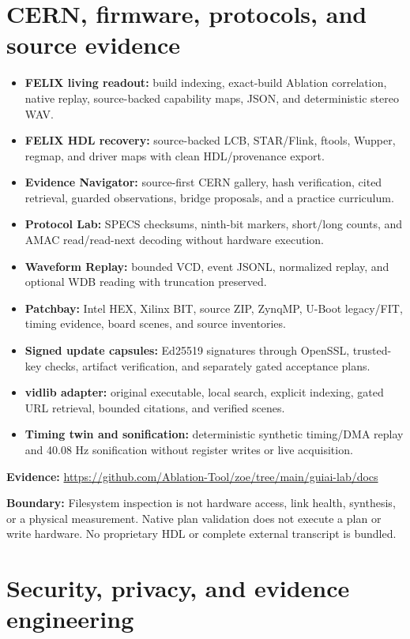 \documentclass[11pt]{article}
\newcommand{\boundary}[1]{\par\smallskip\small\color{ZoeGray}\textbf{Boundary:} #1\normalsize\par\smallskip}
\newcommand{\evidence}[1]{\par\smallskip\small\color{ZoeGray}\textbf{Evidence:} #1\normalsize\par\smallskip}
\begin{document}
\clearpage
\section{CERN, firmware, protocols, and source evidence}

\begin{itemize}
  \item \textbf{FELIX living readout:} build indexing, exact-build Ablation correlation, native replay, source-backed capability maps, JSON, and deterministic stereo WAV.
  \item \textbf{FELIX HDL recovery:} source-backed LCB, STAR/Flink, ftools, Wupper, regmap, and driver maps with clean HDL/provenance export.
  \item \textbf{Evidence Navigator:} source-first CERN gallery, hash verification, cited retrieval, guarded observations, bridge proposals, and a practice curriculum.
  \item \textbf{Protocol Lab:} SPECS checksums, ninth-bit markers, short/long counts, and AMAC read/read-next decoding without hardware execution.
  \item \textbf{Waveform Replay:} bounded VCD, event JSONL, normalized replay, and optional WDB reading with truncation preserved.
  \item \textbf{Patchbay:} Intel HEX, Xilinx BIT, source ZIP, ZynqMP, U-Boot legacy/FIT, timing evidence, board scenes, and source inventories.
  \item \textbf{Signed update capsules:} Ed25519 signatures through OpenSSL, trusted-key checks, artifact verification, and separately gated acceptance plans.
  \item \textbf{vidlib adapter:} original executable, local search, explicit indexing, gated URL retrieval, bounded citations, and verified scenes.
  \item \textbf{Timing twin and sonification:} deterministic synthetic timing/DMA replay and 40.08 Hz sonification without register writes or live acquisition.
\end{itemize}

\evidence{\url{https://github.com/Ablation-Tool/zoe/tree/main/guiai-lab/docs}}
\boundary{Filesystem inspection is not hardware access, link health, synthesis, or a physical measurement. Native plan validation does not execute a plan or write hardware. No proprietary HDL or complete external transcript is bundled.}

\clearpage
\section{Security, privacy, and evidence engineering}
\end{document}
